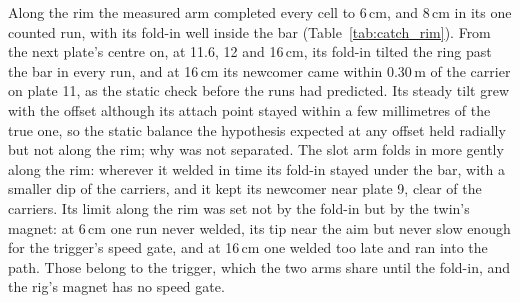 
Along the rim the measured arm completed every cell to 6\,cm, and 8\,cm in its one counted run, with its fold-in well
inside the bar (Table~\ref{tab:catch_rim}). From the next plate's centre on, at 11.6, 12 and 16\,cm, its fold-in tilted
the ring past the bar in every run, and at 16\,cm its newcomer came within 0.30\,m of the carrier on plate 11, as the
static check before the runs had predicted. Its steady tilt grew with the offset although its attach point stayed within
a few millimetres of the true one, so the static balance the hypothesis expected at any offset held radially but not
along the rim; why was not separated. The slot arm folds in more gently along the rim: wherever it welded in time its
fold-in stayed under the bar, with a smaller dip of the carriers, and it kept its newcomer near plate 9, clear of the
carriers. Its limit along the rim was set not by the fold-in but by the twin's magnet: at 6\,cm one run never welded,
its tip near the aim but never slow enough for the trigger's speed gate, and at 16\,cm one welded too late and ran into
the path. Those belong to the trigger, which the two arms share until the fold-in, and the rig's magnet has no speed
gate.

